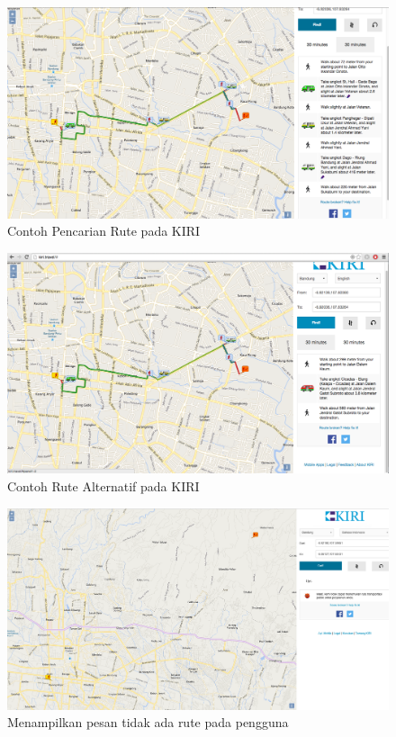 \begin{figure}[H]
	\centering
	\includegraphics[scale=0.3]{Gambar/KIRI-find}
	\caption{Contoh Pencarian Rute pada KIRI} 
	\label{fig:5_KIRI_find}
\end{figure}

\begin{figure}[H]
	\centering
	\includegraphics[scale=0.3]{Gambar/KIRI-find-alternate}
	\caption{Contoh Rute Alternatif pada KIRI} 
	\label{fig:5_KIRI_find_alternate}
\end{figure}

\begin{figure}[H]
	\centering
	\includegraphics[scale=0.3]{Gambar/KIRI-notfound}
	\caption{Menampilkan pesan tidak ada rute pada pengguna} 
	\label{fig:5_KIRI_not_found}
\end{figure}

